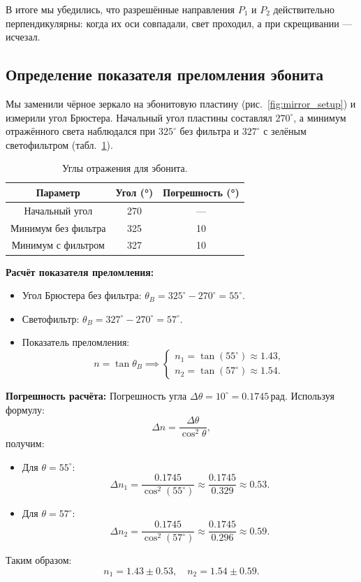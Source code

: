 В итоге мы убедились, что разрешённые направления \( P_1 \) и \( P_2 \) действительно перпендикулярны: когда их оси совпадали, свет проходил, а при скрещивании — исчезал.

\subsection{Определение показателя преломления эбонита}

Мы заменили чёрное зеркало на эбонитовую пластину (рис.~\ref{fig:mirror_setup}) и измерили угол Брюстера. Начальный угол пластины составлял \( 270^\circ \), а минимум отражённого света наблюдался при \( 325^\circ \) без фильтра и \( 327^\circ \) с зелёным светофильтром (табл.~\ref{tab:ebonite}).

\begin{table}[h]
    \centering
    \caption{Углы отражения для эбонита.}
    \begin{tabular}{|c|c|c|}
        \hline
        Параметр & Угол (°) & Погрешность (°) \\ 
        \hline
        Начальный угол & 270 & — \\ 
        \hline
        Минимум без фильтра & 325 & 10 \\ 
        \hline
        Минимум с фильтром & 327 & 10 \\ 
        \hline
    \end{tabular}
    
    \label{tab:ebonite}
\end{table}

\textbf{Расчёт показателя преломления:} 
\begin{itemize}
    \item Угол Брюстера без фильтра: \( \theta_B = 325^\circ - 270^\circ = 55^\circ \).
    \item Светофильтр: \( \theta_B = 327^\circ - 270^\circ = 57^\circ \).
    \item Показатель преломления: 
    \[
    n = \tan\theta_B \implies 
    \begin{cases}
        n_1 = \tan(55^\circ) \approx 1.43, \\
        n_2 = \tan(57^\circ) \approx 1.54.
    \end{cases}
    \]
\end{itemize}

\textbf{Погрешность расчёта:} 
Погрешность угла \( \Delta\theta = 10^\circ = 0.1745 \, \text{рад} \). Используя формулу:
\[
\Delta n = \frac{\Delta\theta}{\cos^2\theta},
\]
получим:
\begin{itemize}
    \item Для \( \theta = 55^\circ \): 
    \[
    \Delta n_1 = \frac{0.1745}{\cos^2(55^\circ)} \approx \frac{0.1745}{0.329} \approx 0.53.
    \]
    \item Для \( \theta = 57^\circ \): 
    \[
    \Delta n_2 = \frac{0.1745}{\cos^2(57^\circ)} \approx \frac{0.1745}{0.296} \approx 0.59.
    \]
\end{itemize}
Таким образом:
\[
n_1 = 1.43 \pm 0.53, \quad n_2 = 1.54 \pm 0.59.
\]


